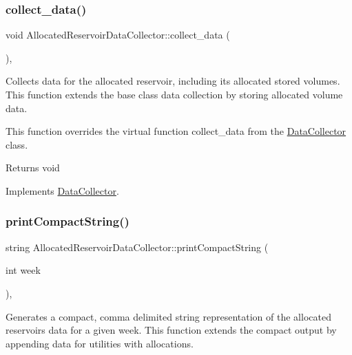 \subsubsection{\texorpdfstring{collect\+\_\+data()}{collect\_data()}}
{\footnotesize\ttfamily void Allocated\+Reservoir\+Data\+Collector\+::collect\+\_\+data (\begin{DoxyParamCaption}{ }\end{DoxyParamCaption})\hspace{0.3cm}{\ttfamily [override]}, {\ttfamily [virtual]}}



Collects data for the allocated reservoir, including its allocated stored volumes. This function extends the base class data collection by storing allocated volume data. 

This function overrides the virtual function {\ttfamily collect\+\_\+data} from the {\ttfamily \mbox{\hyperlink{classDataCollector}{Data\+Collector}}} class.

\begin{DoxyReturn}{Returns}
void 
\end{DoxyReturn}


Implements \mbox{\hyperlink{classDataCollector_a01486bf58acbe37b203f97b3b9a79c40}{Data\+Collector}}.

\mbox{\label{classAllocatedReservoirDataCollector_a35f8125d428e65c737ff3360ae9bd0cd}} 
\subsubsection{\texorpdfstring{print\+Compact\+String()}{printCompactString()}}
{\footnotesize\ttfamily string Allocated\+Reservoir\+Data\+Collector\+::print\+Compact\+String (\begin{DoxyParamCaption}\item[{int}]{week }\end{DoxyParamCaption})\hspace{0.3cm}{\ttfamily [override]}, {\ttfamily [virtual]}}



Generates a compact, comma delimited string representation of the allocated reservoir\textquotesingle{}s data for a given week. This function extends the compact output by appending data for utilities with allocations. 

